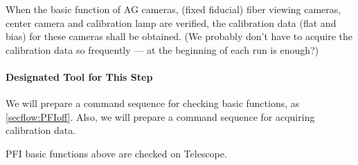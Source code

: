 When the basic function of AG cameras, (fixed fiducial) fiber viewing cameras, center camera and calibration lamp are verified, the calibration data (flat and bias) for these cameras shall be obtained.
(We probably don't have to acquire the calibration data so frequently --- at the beginning of each run is enough?)

\paragraph{Designated Tool for This Step}
We will prepare a command sequence for checking basic functions, as \ref{secflow:PFIoff}.
Also, we will prepare a command sequence for acquiring calibration data.

\begin{itembox}[l]{}
PFI basic functions above are checked on Telescope. 

\end{itembox}